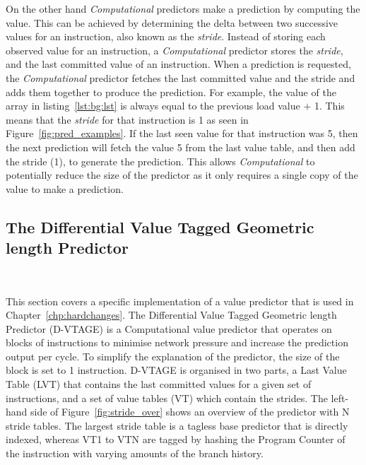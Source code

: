
On the other hand \textit{Computational} predictors make a prediction by computing the value.
This can be achieved by determining the delta between two successive values for an instruction, also known as the \textit{stride}.
Instead of storing each observed value for an instruction, a \textit{Computational} predictor stores the \textit{stride}, and the last committed value of an instruction.
When a prediction is requested, the \textit{Computational} predictor fetches the last committed value and the stride and adds them together to produce the prediction.
For example, the value of the array in listing~\ref{lst:bg:lst} is always equal to the previous load value $+$ 1.
This means that the \textit{stride} for that instruction is 1 as seen in Figure~\ref{fig:pred_examples}.
If the last seen value for that instruction was 5, then the next prediction will fetch the value 5 from the last value table, and then add the stride (1), to generate the prediction.
This allows \textit{Computational} to potentially reduce the size of the predictor as it only requires a single copy of the value to make a prediction. 


\subsection{The Differential Value Tagged Geometric length Predictor}~\label{chp:bck:vtage}

This section covers a specific implementation of a value predictor that is used in Chapter~\ref{chp:hardchanges}.
The Differential Value Tagged Geometric length Predictor (D-VTAGE) \cite{peraisBeBop2015} is a Computational value predictor that operates on blocks of instructions to minimise network pressure and increase the prediction output per cycle.
To simplify the explanation of the predictor, the size of the block is set to 1 instruction.
D-VTAGE is organised in two parts, a Last Value Table (LVT) that contains the last committed values for a given set of instructions, and a set of value tables (VT) which contain the strides.
The left-hand side of Figure~\ref{fig:stride_over} shows an overview of the predictor with N stride tables.
The largest stride table is a tagless base predictor that is directly indexed, whereas VT1 to VTN are tagged by hashing the Program Counter of the instruction with varying amounts of the branch history.

